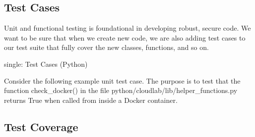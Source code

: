 \begin{Shaded}
\begin{Highlighting}[]
\NormalTok{[tox]}
\OperatorTok{=}
\OperatorTok{=}

\NormalTok{[testenv]}
\OperatorTok{=} 
\OperatorTok{=}
\OperatorTok{=} 
\OperatorTok{=} 
\OperatorTok{=} 
\OperatorTok{-}\OperatorTok{-}\OperatorTok{--}\OperatorTok{=}
\OperatorTok{--}\OperatorTok{=}
\end{Highlighting}
\end{Shaded}

\hypertarget{test-cases}{%
\subsection{Test Cases}\label{test-cases}}

Unit and functional testing is foundational in developing robust, secure
code. We want to be sure that when we create new code, we are also
adding test cases to our test suite that fully cover the new classes,
functions, and so on.

single: Test Cases (Python)

Consider the following example unit test case. The purpose is to test
that the function check\_docker() in the file
python/cloudlab/lib/helper\_functions.py returns True when called from
inside a Docker container.

\begin{Shaded}
\begin{Highlighting}[]


\end{Highlighting}
\end{Shaded}

\hypertarget{test-coverage}{%
\subsection{Test Coverage}\label{test-coverage}}

